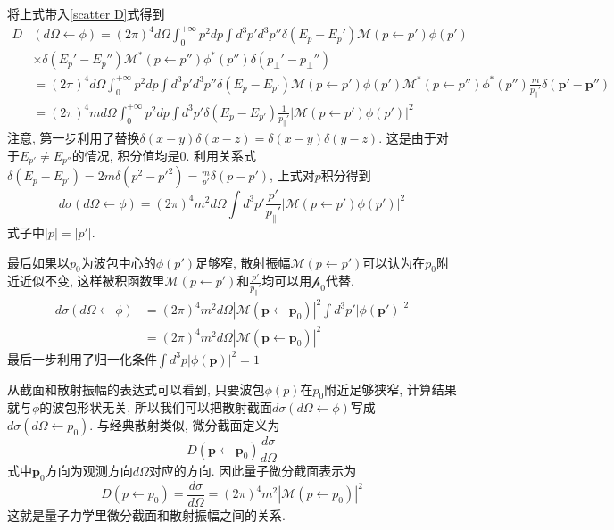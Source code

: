 \documentclass[a4paper,11pt]{book}
\begin{document}
将上式带入\eqref{scatter D}式得到
\begin{equation*}
  \begin{split}
     D&(d\Omega\leftarrow\phi)=(2\pi)^4 d\Omega\int_{0}^{+\infty}p^2dp\int d^3p'd^3p''\delta(E_p-E_p')\mathcal{M}(p\leftarrow p')\phi(p')\\
     &\times\delta(E_p'-E_p'')\mathcal{M}^*(p\leftarrow p'')\phi^*(p'')\delta(p_\perp'-p_\perp'')\\
       &=(2\pi)^4 d\Omega\int_{0}^{+\infty}p^2dp\int d^3p'd^3p''\delta(E_p-E_{p'})\mathcal{M}(p\leftarrow p')\phi(p')\mathcal{M}^*(p\leftarrow p'')\phi^*(p'')\frac{m}{p_\parallel'}\delta(\mathbf{p}'-\mathbf{p}'')\\
       &=(2\pi)^4md\Omega\int_{0}^{+\infty}p^2dp\int d^3p'\delta(E_p-E_{p'})\frac{1}{p_\parallel'}|\mathcal{M}(p\leftarrow p')\phi(p')|^2
  \end{split}
\end{equation*}
注意, 第一步利用了替换$\delta(x-y)\delta(x-z)=\delta(x-y)\delta(y-z)$. 这是由于对于$E_{p'}\neq E_{p''}$的情况, 积分值均是$0$. 利用关系式$\delta(E_p-E_{p'})=2m\delta(p^2-p'^2)=\frac{m}{p'}\delta(p-p')$, 上式对$p$积分得到
\begin{equation*}
  d\sigma(d\Omega\leftarrow\phi)=(2\pi)^4m^2d\Omega\int d^3p'\frac{p'}{p_\parallel'}|\mathcal{M}(p\leftarrow p')\phi(p')|^2
\end{equation*}
式子中$|p|=|p'|$.

最后如果以$p_0$为波包中心的$\phi(p')$足够窄, 散射振幅$\mathcal{M}(p\leftarrow p')$可以认为在$p_0$附近近似不变, 这样被积函数里$\mathcal{M}(p\leftarrow p')$和$\frac{p'}{p_\parallel'}$均可以用$\mathcal{p}_0$代替.
\begin{equation}
  \begin{split}
     d\sigma(d\Omega\leftarrow\phi)&=(2\pi)^4m^2d\Omega|\mathcal{M}(\mathbf{p}\leftarrow\mathbf{p}_0)|^2\int d^3p'|\phi(\mathbf{p}')|^2\\
       &=(2\pi)^4m^2d\Omega|\mathcal{M}(\mathbf{p}\leftarrow\mathbf{p}_0)|^2
  \end{split}
\end{equation}
最后一步利用了归一化条件$\int d^3p|\phi(\mathbf{p})|^2=1$

从截面和散射振幅的表达式可以看到, 只要波包$\phi(p)$在$p_0$附近足够狭窄, 计算结果就与$\phi$的波包形状无关, 所以我们可以把散射截面$d\sigma(d\Omega\leftarrow\phi)$写成$d\sigma(d\Omega\leftarrow p_0)$. 与经典散射类似, 微分截面定义为
\begin{equation*}
  D(\mathbf{p}\leftarrow\mathbf{p}_0)\frac{d\sigma}{d\Omega}
\end{equation*}
式中$\mathbf{p}_0$方向为观测方向$d\Omega$对应的方向. 因此量子微分截面表示为
\begin{equation}\label{scatter cross section amp}
  D(p\leftarrow p_0)=\frac{d\sigma}{d\Omega}=(2\pi)^4m^2|\mathcal{M}(p\leftarrow p_0)|^2
\end{equation}
这就是量子力学里微分截面和散射振幅之间的关系.
\end{document}
